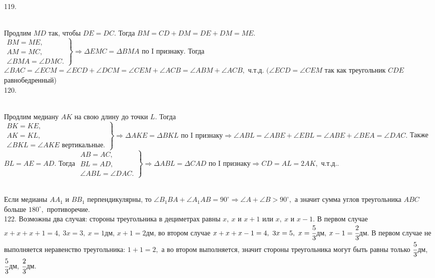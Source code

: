119. \begin{figure}[ht!]
\end{figure}\\
Продлим $MD$ так, чтобы $DE=DC.$ Тогда $BM=CD+DM=DE+DM=ME.$\\ $\left.\begin{array}{l}BM=ME,\\
AM=MC,\\
\angle BMA=\angle DMC. \end{array}\right\}\Rightarrow \Delta EMC=\Delta BMA\text{ по I признаку.}$ Тогда
$\angle BAC=\angle ECM=\angle ECD+\angle DCM=\angle CEM+\angle ACB=\angle ABM+\angle ACB,$ ч.т.д. $(\angle ECD=\angle CEM$ так как треугольник $CDE$ равнобедренный)\\
120. \begin{figure}[ht!]
\end{figure}\\
Продлим медиану $AK$ на свою длину до точки $L.$ Тогда $\left.\begin{array}{l}BK=KE,\\
AK=KL,\\
\angle BKL=\angle AKE\text{ вертикальные.} \end{array}\right\}\Rightarrow \Delta AKE=\Delta BKL\text{ по I признаку}\Rightarrow
\angle ABL=\angle ABE+\angle EBL=\angle ABE+\angle BEA=\angle DAC.$ Также  $BL=AE=AD.$ Тогда
$\left.\begin{array}{l}AB=AC,\\
BL=AD,\\
\angle ABL=\angle DAC. \end{array}\right\}\Rightarrow \Delta ABL=\Delta CAD\text{ по I признаку}\Rightarrow CD=AL=2AK,$ ч.т.д.\newpage{}. \begin{figure}[ht!]
\end{figure}\\
Если медианы $AA_1$ и $BB_1$ перпендикулярны, то $\angle B_1BA+\angle A_1AB=90^\circ\Rightarrow\angle A+\angle B>90^\circ,$ а значит сумма углов треугольника $ABC$ больше $180^\circ,$ противоречие.\\
122. Возможны два случая: стороны треугольника в дециметрах равны $x,\ x$ и $x+1$ или $x,\ x$ и $x-1.$ В первом случае $x+x+x+1=4,\ 3x=3,\ x=1$дм, $x+1=2$дм, во втором случае $x+x+x-1=4,\ 3x=5,\ x=\cfrac{5}{3}$дм, $x-1=\cfrac{2}{3}$дм. В первом случае не выполняется неравенство треугольника: $1+1=2,$ а во втором выполняется, значит стороны треугольника могут быть равны только $\cfrac{5}{3}$дм, $\cfrac{5}{3}$дм, $\cfrac{2}{3}$дм.\\
